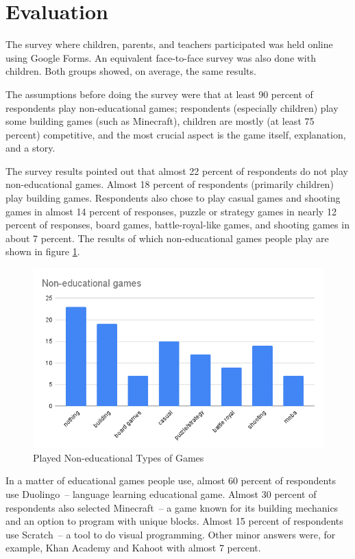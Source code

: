 \section{Evaluation}

The survey where children, parents, and teachers participated was held online using Google Forms.
An equivalent face-to-face survey was also done with children.
Both groups showed, on average, the same results.

The assumptions before doing the survey were that at least 90 percent of respondents play non-educational games;
respondents (especially children) play some building games (such as Minecraft), children are mostly (at least 75 percent) competitive, and the most crucial aspect is the game itself, explanation, and a story.

The survey results pointed out that almost 22 percent of respondents do not play non-educational games.
Almost 18 percent of respondents (primarily children) play building games.
Respondents also chose to play casual games and shooting games in almost 14 percent of responses, puzzle or strategy games in nearly 12 percent of responses, board games, battle-royal-like games, and shooting games in about 7 percent.
The results of which non-educational games people play are shown in figure \ref{fig:survey:games}.

\begin{figure}
    \centering
    \includegraphics[width=1\linewidth]{assets/survey/non-educational-games.png}
    \caption{Played Non-educational Types of Games}
    \label{fig:survey:games}
\end{figure}

In a matter of educational games people use, almost 60 percent of respondents use Duolingo~-- language learning educational game.
Almost 30 percent of respondents also selected Minecraft~-- a game known for its building mechanics and an option to program with unique blocks.
Almost 15 percent of respondents use Scratch~-- a tool to do visual programming.
Other minor answers were, for example, Khan Academy and Kahoot with almost 7 percent.  

